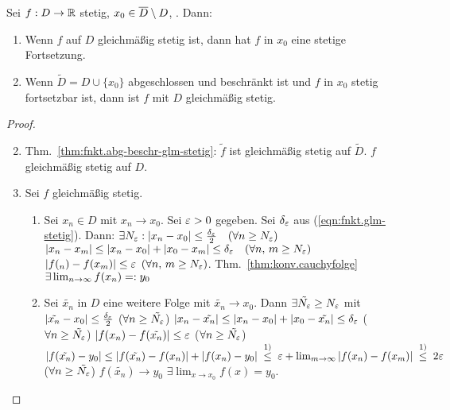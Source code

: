 \documentclass[12pt]{scrreprt}
\begin{document}
\begin{satz}Sei $f:D\rightarrow \mathbb{R}$ stetig, $x_0\in\overline{D}\setminus D$, . Dann:\label{satz:fnkt.glm-stetig-forts}
\begin{enumerate}
\item Wenn $f$ auf $D$ gleichmäßig stetig ist, dann hat $f$ in $x_0$ eine stetige Fortsetzung. \label{satz:fnkt.glm-stetig-forts.a}
\item Wenn $\tilde{D}=D\cup\{x_0\}$ abgeschlossen und beschränkt ist und $f$ in $x_0$ stetig fortsetzbar ist, 
dann ist $f$ mit $D$ gleichmäßig stetig.\label{satz:fnkt.glm-stetig-forts.b}
\end{enumerate}
\end{satz}
\begin{proof}
\begin{enumerate}\setcounter{enumi}{1}
\item Thm.~\ref{thm:fnkt.abg-beschr-glm-stetig}: $\tilde{f}$ ist gleichmäßig stetig auf $\tilde{D}$. \folgt 
$f$ gleichmäßig stetig auf $D$.\setcounter{enumi}{0}
\item Sei $f$ gleichmäßig stetig.
\begin{enumerate}
\item Sei $x_n\in D$ mit $x_n\to x_0$. Sei $\varepsilon>0$ gegeben. Sei $\delta_\varepsilon$ aus (\ref{eqn:fnkt.glm-stetig}). Dann:
$\exists N_\varepsilon: \left\lvert x_n - x_0\right\lvert \le \frac{\delta_\varepsilon}{2}\quad (\forall n \ge N_\varepsilon)$
\folgt $\left\lvert x_n - x_m\right\lvert \le \left\lvert x_n - x_0\right\lvert + \left\lvert x_0 - x_m\right\lvert \le \delta_\varepsilon\quad (\forall n,\,m \ge N_\varepsilon)$ 
\folgtnach{(\ref{eqn:fnkt.glm-stetig})} $\left\lvert f(_n) - f(x_m)\right\lvert \le \varepsilon$ $(\forall n,\,m \ge N_\varepsilon)$. 
Thm.~\ref{thm:konv.cauchyfolge} \folgt $\exists \lim_{n\rightarrow\infty} f(x_n) =: y_0$
\item Sei $\tilde{x_n}$ in $D$ eine weitere Folge mit $\tilde{x_n} \to x_0$. Dann $\exists \tilde{N_\varepsilon} \ge N_\varepsilon$
mit $\left\lvert\tilde{x_n} - x_0\right\lvert \le \frac{\delta_\varepsilon}{2}$ ($\forall n \ge \tilde{N_\varepsilon}$)
\folgt $\left\lvert x_n - \tilde{x_n}\right\lvert \le \left\lvert x_n - x_0\right\lvert + \left\lvert x_0 - \tilde{x_n}\right\lvert \le \delta_\varepsilon$ ($\forall n \ge \tilde{N_\varepsilon}$)
\folgtnach{(\ref{eqn:fnkt.glm-stetig})} $\left\lvert f(x_n) - f(\tilde{x_n})\right\lvert \le \varepsilon$  ($\forall n \ge \tilde{N_\varepsilon}$)
\folgt $\abs{f(\tilde{x_n}) - y_0} \le \abs{f(\tilde{x_n}) - f(x_n)} + \abs{f(x_n) - y_0} \nach{\le}{1)}
\ep + \lim_{m\to\infty}\abs{f(x_n)-f(x_m)} \nach{\le}{1)} 2\ep$ ($\forall n \ge \tilde{N_\varepsilon}$)
\folgt $f(\tilde{x_n}) \to y_0$ \folgt $\exists\lim_{x\to x_0} f(x) = y_0$.
\end{enumerate}
\end{enumerate}
\end{proof}
\end{document}
